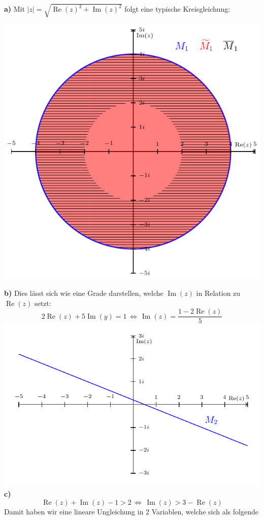 \documentclass[a4paper,graphics,11pt]{article}
\newcommand{\re}{\operatorname{Re}}
\newcommand{\im}{\operatorname{Im}}
\begin{document}
\textbf{a)}
Mit $|z| = \sqrt{\re(z)^2+\im(z)^2}$ folgt eine typische Kreisgleichung:
\begin{center}
    \includegraphics{graphics/graph1.pdf}
\end{center}
\textbf{b)}
Dies lässt sich wie eine Grade darstellen, welche $\im(z)$ in Relation zu $\re(z)$ setzt:
$$
    2\re(z) + 5\im(y) = 1
    \,\Longleftrightarrow\, \im(z) = \frac{1-2\re(z)}{5}
$$
\qquad\qquad\qquad\includegraphics{graphics/graph2.pdf}
\newpage
\textbf{c)}
$$
    \re(z) + \im(z) -1 > 2
    \,\Longleftrightarrow\, \im(z) > 3-\re(z)
$$
Damit haben wir eine lineare Ungleichung in 2 Variablen, welche sich als folgende
\end{document}
